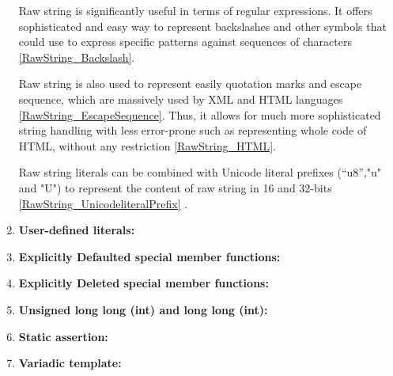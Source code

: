 \documentclass[11pt]{report}
\begin{document}
\begin{enumerate}
Raw string is significantly useful in terms of regular expressions. It offers sophisticated and easy way to represent backslashes and other symbols that could use to express specific patterns against sequences of characters \ref{RawString_Backslash}.
\newline

Raw string is also used to represent easily quotation marks and escape sequence, which are massively used by XML and HTML languages \ref{RawString_EscapeSequence}. Thus, it allows for much more sophisticated string handling with less error-prone such as representing whole code of HTML, without any restriction \ref{RawString_HTML}.
\newline

Raw string literals can be combined with Unicode literal prefixes  (“u8”,"u" and "U") to represent the content of raw string in 16 and 32-bits \ref{RawString_UnicodeliteralPrefix} \cite{Gregorie:professionalcpp}.

\item \textbf{User-defined literals:}
\item \textbf{Explicitly Defaulted special member functions:}
\item \textbf{Explicitly Deleted special member functions:}
\item \textbf{Unsigned long long (int) and long long (int):} 
\item \textbf{Static assertion:}
\item \textbf{Variadic template:}
\end{enumerate}




	
\end{document}
